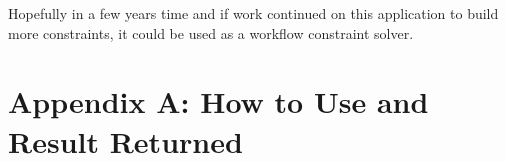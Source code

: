 \documentclass[a4paper]{report}
\begin{document}
Hopefully in a few years time and if work continued on this application to build more constraints, it could be used as a workflow constraint solver. 

\chapter{Appendix A: How to Use and Result Returned}


\end{document}
